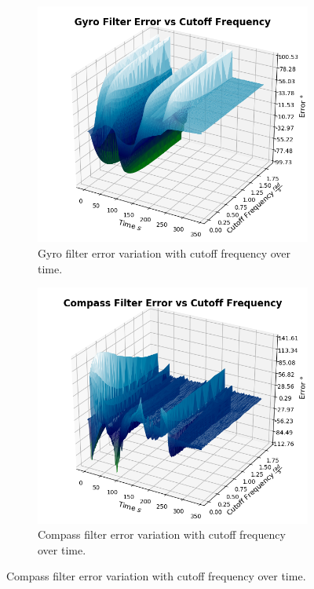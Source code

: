 \begin{figure}[H]
\centering
\begin{subfigure}{0.5\linewidth}
  \centering
  \includegraphics[width=\linewidth]{img/gyroFilterErrorCutoffFrequency.png}
  \caption{Gyro filter error variation with cutoff frequency over time.}
  \label{fig:gyro_filter_error_cutoff_frequency}
\end{subfigure}%
\begin{subfigure}{0.5\linewidth}
  \centering
  \includegraphics[width=\linewidth]{img/compassFilterErrorCutoffFrequency.png}
  \caption{Compass filter error variation with cutoff frequency over time.}
  \label{fig:sub2}
\end{subfigure}
\caption{Compass filter error variation with cutoff frequency over time.}
\label{fig:compass_filter_error_cutoff_frequency}
\end{figure}

